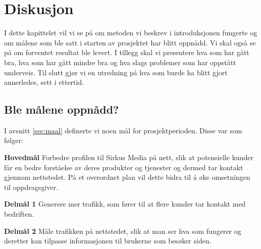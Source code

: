 \cleardoublepage
\chapter{Diskusjon}
\label{chap:discussion} 

I dette kapittelet vil vi se på om metoden vi beskrev i introduksjonen fungerte og om målene som ble satt i starten av prosjektet har blitt oppnådd. Vi skal også se på om forventet resultat ble levert. I tillegg skal vi presentere hva som har gått bra, hva som har gått mindre bra og hva slags problemer som har oppstått underveis. Til slutt gjør vi en utredning på hva som burde ha blitt gjort annerledes, sett i ettertid.

\section{Ble målene oppnådd?}
I avsnitt \ref{sec:maal} definerte vi noen mål for prosjektperioden. Disse var som følger:

\begin{compactitem}
\item [{\bf Hovedmål}] Forbedre profilen til Sirkus Media på nett, slik at potensielle kunder får en bedre forståelse av deres produkter og tjenester og dermed tar kontakt gjennom nettstedet. På et overordnet plan vil dette bidra til å øke omsetningen til oppdragsgiver.
\begin{compactitem}
\item [{\bf  Delmål 1} ] Generere mer trafikk, som fører til at flere kunder tar kontakt med bedriften. 
\item [{\bf  Delmål 2} ] Måle trafikken på nettstedet, slik at man ser hva som fungerer og deretter kan tilpasse informasjonen til brukerne som besøker siden.
\end{compactitem}
\end{compactitem}

